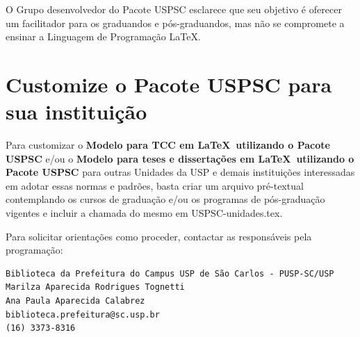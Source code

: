 O Grupo desenvolvedor do Pacote USPSC esclarece que seu objetivo \'e oferecer um facilitador para os graduandos e pós-graduandos, mas não se compromete a ensinar a Linguagem de Programação \LaTeX .  

\section{Customize o Pacote USPSC para sua instituição}

Para customizar o \textbf{Modelo para TCC em \LaTeX\ utilizando o Pacote USPSC} e/ou o \textbf{Modelo para teses e dissertações em \LaTeX\ utilizando o Pacote USPSC} para outras Unidades da USP e demais instituições interessadas em adotar essas normas e padrões, basta criar um arquivo pr\'e-textual contemplando os cursos de graduação e/ou os programas de pós-graduação vigentes e incluir a chamada do mesmo em USPSC-unidades.tex.

Para solicitar orientações como proceder, contactar as respons\'aveis pela programação:

\begin{verbatim}
Biblioteca da Prefeitura do Campus USP de São Carlos - PUSP-SC/USP
Marilza Aparecida Rodrigues Tognetti
Ana Paula Aparecida Calabrez
biblioteca.prefeitura@sc.usp.br
(16) 3373-8316
\end{verbatim}





